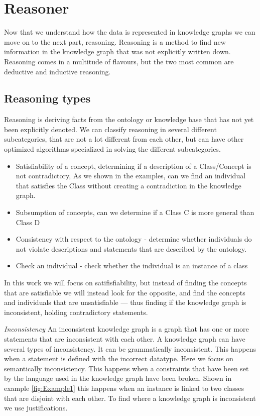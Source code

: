 \documentclass[11pt,letterpaper ,oneside ]{book}
\begin{document}
\section{Reasoner}
Now that we understand how the data is represented in knowledge graphs we can move on to the next part, reasoning. Reasoning is a method to find new information in the knowledge graph that was not explicitly written down. Reasoning comes in a multitude of flavours, but the two most common are deductive and inductive reasoning. 

\subsection{Reasoning types}
Reasoning is deriving facts from the ontology or knowledge base that has not yet been explicitly denoted. We can classify reasoning in several different subcategories, that are not a lot different from each other, but can have other optimized algorithms specialized in solving the different subcategories.

\begin{itemize}
	\item Satisfiability of a concept, determining if a description of a Class/Concept is not contradictory, As we shown in the examples, can we find an individual that satisfies the Class without creating a contradiction in the knowledge graph. 
	\item Subsumption of concepts, can we determine if a Class C is more general than Class D
	\item Consistency with respect to the ontology - determine whether individuals do not violate descriptions and statements that are described by the ontology.
	\item Check an individual - check whether the individual is an instance of a class
\end{itemize}

In this work we will focus on satifisfiability, but instead of finding the concepts that are satisfiable we will instead look for the opposite, and find the concepts and individuals that are unsatisfiable — thus finding if the knowledge graph is inconsistent, holding contradictory statements.

\textit{Inconsistency} An inconsistent knowledge graph is a graph that has one or more statements that are inconsistent with each other. A knowledge graph can have several types of inconsistency. It can be grammatically inconsistent. This happens when a statement is defined with the incorrect datatype. Here we focus on semantically inconsistency. This happens when a constraints that have been set by the language used in the knowledge graph have been broken. Shown in example \ref{fig:Example1} this happens when an instance is linked to two classes that are disjoint with each other. To find where a knowledge graph is inconsistent we use justifications.   
\end{document}
